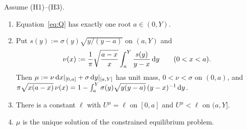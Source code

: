 \begin{theorem}\label{thm:Q}
Assume \textup{(H1)--(H3)}.
\begin{enumerate}
\item[(i)] Equation~\eqref{eq:Q} has exactly one root $a\in(0,Y)$.
\item[(ii)] Put $s(y):=\sigma(y)\sqrt{y/(y-a)}$ on $(a,Y)$ and
\begin{equation}\label{eq:nu}
  \nu(x):=\frac1\pi\sqrt{\frac{a-x}x}\int_a^Y\frac{s(y)}{y-x}\,\mathrm{d} y\qquad(0<x<a).
\end{equation}
Then $\mu:=\nu\,\mathrm{d} x|_{[0,a]}+\sigma\,\mathrm{d} y|_{[a,Y]}$ has unit mass, $0<\nu<\sigma$ on $(0,a)$, and
$\pi\sqrt{x(a-x)}\,\nu(x)=1-\int_a^Y\sigma(y)\sqrt{y(y-a)}\,(y-x)^{-1}\,\mathrm{d} y$.
\item[(iii)] There is a constant $\ell$ with $U^\mu=\ell$ on $[0,a]$ and $U^\mu<\ell$ on $(a,Y]$.
\item[(iv)] $\mu$ is the unique solution of the constrained equilibrium problem.
\end{enumerate}
\end{theorem}

